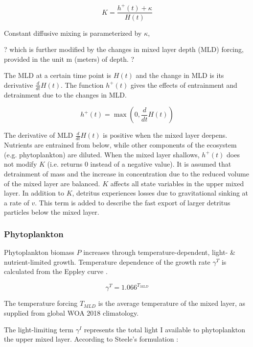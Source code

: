 \documentclass[template.tex]{subfiles}
\begin{document}
\begin{equation}
    K = \frac{h^{+}(t) + \kappa}{H(t)}
\end{equation}

Constant diffusive mixing is parameterized by $\kappa$, 

? which is further modified by the changes in mixed layer depth (MLD) forcing, provided in the unit \unit{m} (meters) of depth. ?

The MLD at a certain time point is $H(t)$ and the change in MLD is its derivative $\frac{d}{d t} H(t)$. The function $h^{+}(t)$ gives the effects of entrainment and detrainment due to the changes in MLD.

\begin{equation}
    h^{+}(t) = \max\left(0, \frac{d}{d t} H(t)\right)
\end{equation}

The derivative of MLD $\frac{d}{d t} H(t)$ is positive when the mixed layer deepens. Nutrients are entrained from below, while other components of the ecosystem (e.g. phytoplankton) are diluted. When the mixed layer shallows, $h^{+}(t)$ does not modify $K$ (i.e. returns 0 instead of a negative value). It is assumed that detrainment of mass and the increase in concentration due to the reduced volume of the mixed layer are balanced.
$K$ affects all state variables in the upper mixed layer. In addition to $K$, detritus experiences losses due to gravitational sinking at a rate of $v$. This term is added to describe the fast export of larger detritus particles below the mixed layer. 

\subsubsection{Phytoplankton}
Phytoplankton biomass $P$ increases through temperature-dependent, light- \& nutrient-limited growth. Temperature dependence of the  growth rate $\gamma^{T}$ is calculated from the Eppley curve \citep{Eppley1972TemperatureSea}.

\begin{equation}
    \gamma^{T} = 1.066^{T_{MLD}} \label{mumax}
\end{equation}

The temperature forcing $T_{MLD}$ is the average temperature of the mixed layer, as supplied from global WOA 2018 climatology.


The light-limiting term $\gamma^{I}$ represents the total light I available to phytoplankton the upper mixed layer. According to Steele’s formulation \cite{Steele1962EnvironmentalSea}:
\end{document}
